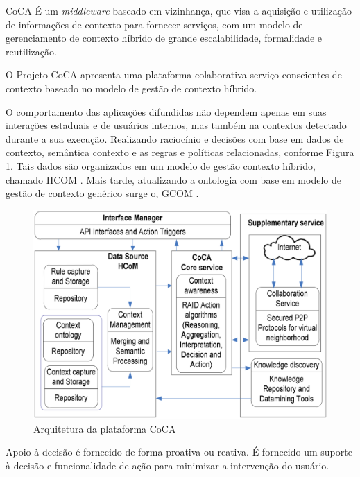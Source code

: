 \documentclass[12pt,a4paper,compsoc]{IEEEtran}
\begin{document}
  CoCA É um \textit{middleware} baseado em vizinhança, que visa a aquisição e utilização de
  informações de contexto para fornecer serviços, com um modelo de gerenciamento de contexto híbrido
  de grande escalabilidade, formalidade e reutilização.
  
  O Projeto CoCA \cite{ejigu2008hybrid} apresenta uma plataforma colaborativa serviço conscientes
  de contexto baseado no modelo de gestão de contexto híbrido.
  
  O comportamento das aplicações difundidas não dependem apenas em suas interações estaduais e de
  usuários internos, mas também na contextos detectado durante a sua execução. Realizando 
  raciocínio e decisões com base em dados de contexto, semântica contexto e as regras e políticas
  relacionadas, conforme Figura \ref{arquitetura-coca}. Tais dados são organizados em um modelo de
  gestão contexto híbrido, chamado HCOM \cite{ejigu2008hybrid}. Mais tarde, atualizando a ontologia
  com base em modelo de gestão de contexto genérico surge o, GCOM \cite{ejigu2008hybrid}.

  \begin{figure}[ht]
    \centerline{\includegraphics[scale=.2]{imagens/arquitetura-coca.png}}
    \caption{Arquitetura da plataforma CoCA \cite{ejigu2008hybrid}}
    \label{arquitetura-coca}
  \end{figure}
  
  Apoio à decisão é fornecido de forma proativa ou reativa. É fornecido um suporte à decisão e 
  funcionalidade de ação para minimizar a intervenção do usuário.
\end{document}
